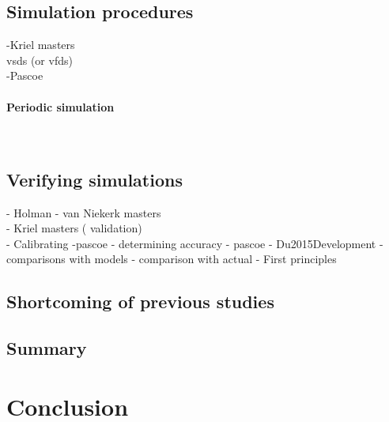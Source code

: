 	\subsection{Simulation procedures}
		-Kriel masters\\
		 \glspl{vsd} (or \glspl{vfd}) \\
		-Pascoe\\
		\paragraph{Periodic simulation}\leavevmode\\
 	\subsection{Verifying simulations}
 		- Holman
 		- van Niekerk masters\\
 		- Kriel masters ( validation)\\
 		- Calibrating -pascoe
 		- determining accuracy - pascoe
 		- Du2015Development
 		- comparisons with models
 		- comparison with actual 
 		- First principles
 	\subsection{Shortcoming of previous studies}
 	\label{Shortcomings of previous work}
	\subsection{Summary}
\section{Conclusion}